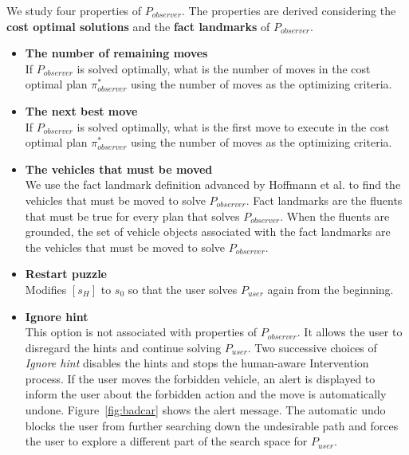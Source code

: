 We study four properties of $P_{observer}$. The properties are derived considering the \textbf{cost optimal solutions} and the \textbf{fact landmarks} of $P_{observer}$.
\begin{itemize}
\item \textbf{The number of remaining moves}\\ If $P_{observer}$ is solved optimally, what is the number of moves in the cost optimal plan $\pi^{*}_{observer}$ using the number of moves as the optimizing criteria.
\item \textbf{The next best move}\\ If $P_{observer}$ is solved optimally, what is the first move to execute in the cost optimal plan $\pi^{*}_{observer}$ using the number of moves as the optimizing criteria.
\item \textbf{The vehicles that must be moved} \\
We use the fact landmark definition advanced by Hoffmann et al. \citeyear{hoffman2004lm} to find the vehicles that must be moved to solve $P_{observer}$.
Fact landmarks are the fluents that must be true for every plan that solves $P_{observer}$. 
When the fluents are grounded, the set of vehicle objects associated with the fact landmarks are the vehicles that must be moved to solve $P_{observer}$.
\item \textbf{Restart puzzle}\\
Modifies $[s_H]$ to $s_0$ so that the user solves $P_{user}$ again from the beginning.
\item \textbf{Ignore hint} \\This option is not associated with properties of $P_{observer}$.
It allows the user to disregard the hints and continue solving $P_{user}$. 
Two successive choices of \textit{Ignore hint} disables the hints and stops the human-aware Intervention process.
If the user moves the forbidden vehicle, an alert is displayed to inform the user about the forbidden action and the move is automatically undone. Figure~\ref{fig:badcar} shows the alert message.
The automatic undo blocks the user from further searching down the undesirable path and forces the user to explore a different part of the search space for $P_{user}$.
\end{itemize}

